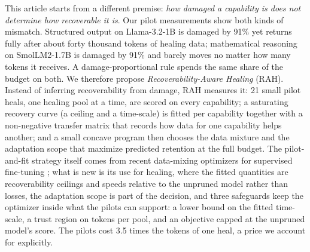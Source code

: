 \documentclass{ieeeaccess}
\newcommand{\RAH}{RAH}
\begin{document}
This article starts from a different premise: \emph{how damaged a capability is does not determine how recoverable it is}. Our pilot measurements show both kinds of mismatch. Structured output on Llama-3.2-1B is damaged by 91\% yet returns fully after about forty thousand tokens of healing data; mathematical reasoning on SmolLM2-1.7B is damaged by 91\% and barely moves no matter how many tokens it receives. A damage-proportional rule spends the same share of the budget on both. We therefore propose \emph{Recoverability-Aware Healing} (\RAH). Instead of inferring recoverability from damage, \RAH{} measures it: 21 small pilot heals, one healing pool at a time, are scored on every capability; a saturating recovery curve (a ceiling and a time-scale) is fitted per capability together with a non-negative transfer matrix that records how data for one capability helps another; and a small concave program then chooses the data mixture and the adaptation scope that maximize predicted retention at the full budget. The pilot-and-fit strategy itself comes from recent data-mixing optimizers for supervised fine-tuning \cite{li2025datamixing,domainpilot2026}; what is new is its use for healing, where the fitted quantities are recoverability ceilings and speeds relative to the unpruned model rather than losses, the adaptation scope is part of the decision, and three safeguards keep the optimizer inside what the pilots can support: a lower bound on the fitted time-scale, a trust region on tokens per pool, and an objective capped at the unpruned model's score. The pilots cost 3.5 times the tokens of one heal, a price we account for explicitly.
\end{document}
